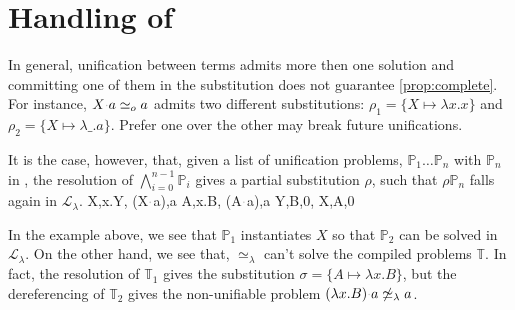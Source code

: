 \documentclass[sigconf,natbib=false,review]{acmart}
\newcommand{\appsep}{\ensuremath{\textcolor{lightgray}{\cdot}}}
\newcommand{\UnifRel}{\ensuremath{\simeq}}
\newcommand{\nUnifRel}{\ensuremath{\not\simeq}}
\newcommand{\Uo}{\ensuremath{\UnifRel_o}\xspace}
\newcommand{\Ue}{\ensuremath{\UnifRel_\lambda}\xspace}
\newcommand{\nUe}{\ensuremath{\nUnifRel_\lambda}\xspace}
\newcommand{\llambda}{\ensuremath{\mathcal{L}_\lambda}\xspace}
\newcommand{\foUnifPb}{\ensuremath{\mathbb{P}}\xspace}
\newcommand{\hoUnifPb}{\ensuremath{\mathbb{T}}\xspace}
\begin{document}
\section{Handling of \notllambda}\label{sec:beta}


In general, unification between \notllambda terms admits more then one
solution and committing one of them in the substitution does not guarantee
\cref{prop:complete}. For instance, $X \appsep a \Uo a$ 
admits two different substitutions: $\rho_1 = \{X \mapsto \lambda x.x\}$
and $\rho_2 = \{X \mapsto \lambda \_.a\}$. Prefer one over the other may break
future unifications.

It is the case, however, that, given a list of unification problems, $\foUnifPb_1\dots
\foUnifPb_n$ with $\foUnifPb_n$ in \notllambda, the resolution of
$\bigwedge_{i=0}^{n-1}\foUnifPb_i$ gives a partial substitution $\rho$, such
that $\rho\foUnifPb_n$ falls again in \llambda.
%
\printAlll
  {{{X,\lambda x.Y},
    {(X\appsep a),a}}}
  {{{A,\lambda x.B},
    {(A\appsep a),a}}}
  {{{Y,B,0},
    {X,A,0}}}
  {{}}

In the example above, we see that $\foUnifPb_1$ instantiates $X$ so that
$\foUnifPb_2$ can be solved in \llambda.
On the other hand, we see that, 
\Ue can't solve the compiled problems \hoUnifPb. In
fact, the resolution of $\hoUnifPb_1$ gives the substitution $\sigma = \{ A
\mapsto \lambda x. B\}$, but the dereferencing of $\hoUnifPb_2$ gives the 
non-unifiable problem $(\lambda x. B) \appsep a \nUe a$.
\end{document}
